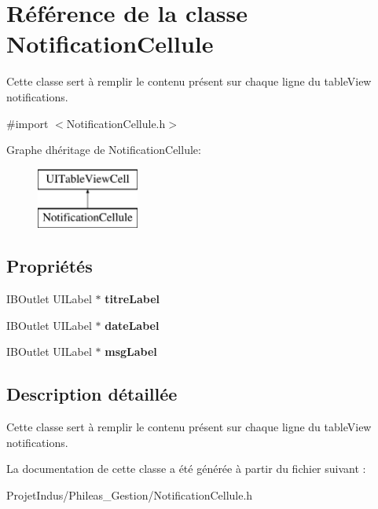 \hypertarget{interface_notification_cellule}{}\section{Référence de la classe Notification\+Cellule}
\label{interface_notification_cellule}


Cette classe sert à remplir le contenu présent sur chaque ligne du table\+View notifications.  




{\ttfamily \#import $<$Notification\+Cellule.\+h$>$}

Graphe d\textquotesingle{}héritage de Notification\+Cellule\+:\begin{figure}[H]
\begin{center}
\leavevmode
\includegraphics[height=2.000000cm]{interface_notification_cellule}
\end{center}
\end{figure}
\subsection*{Propriétés}
\begin{DoxyCompactItemize}
\item 
\hypertarget{interface_notification_cellule_a0ecfdd9cc4abf6bf15945665e9038065}{}I\+B\+Outlet U\+I\+Label $\ast$ {\bfseries titre\+Label}\label{interface_notification_cellule_a0ecfdd9cc4abf6bf15945665e9038065}

\item 
\hypertarget{interface_notification_cellule_a1b0e6d77d1366db598ecf055c14c8f6b}{}I\+B\+Outlet U\+I\+Label $\ast$ {\bfseries date\+Label}\label{interface_notification_cellule_a1b0e6d77d1366db598ecf055c14c8f6b}

\item 
\hypertarget{interface_notification_cellule_a69ce0521b487bd2500421c8cda3b6223}{}I\+B\+Outlet U\+I\+Label $\ast$ {\bfseries msg\+Label}\label{interface_notification_cellule_a69ce0521b487bd2500421c8cda3b6223}

\end{DoxyCompactItemize}


\subsection{Description détaillée}
Cette classe sert à remplir le contenu présent sur chaque ligne du table\+View notifications. 

La documentation de cette classe a été générée à partir du fichier suivant \+:\begin{DoxyCompactItemize}
\item 
Projet\+Indus/\+Phileas\+\_\+\+Gestion/Notification\+Cellule.\+h\end{DoxyCompactItemize}
